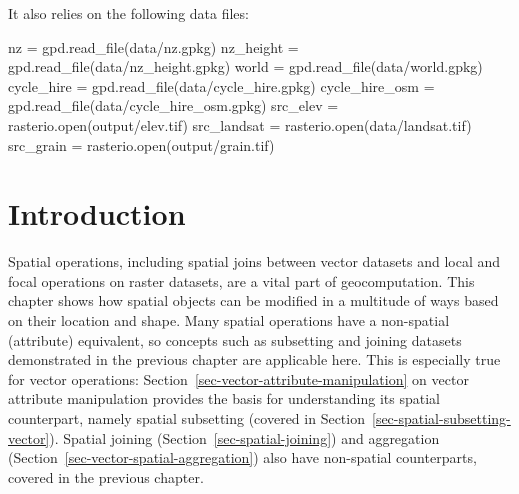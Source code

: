 \documentclass[
  letterpaper,
]{krantz}
\newenvironment{Shaded}{\begin{snugshade}}{\end{snugshade}}
\newcommand{\BuiltInTok}[1]{\textcolor[rgb]{0.00,0.23,0.31}{#1}}
\newcommand{\NormalTok}[1]{\textcolor[rgb]{0.00,0.23,0.31}{#1}}
\newcommand{\OperatorTok}[1]{\textcolor[rgb]{0.37,0.37,0.37}{#1}}
\newcommand{\StringTok}[1]{\textcolor[rgb]{0.13,0.47,0.30}{#1}}
\begin{document}
It also relies on the following data files:

\begin{Shaded}
\begin{Highlighting}[]
\NormalTok{nz }\OperatorTok{=}\NormalTok{ gpd.read\_file(}\StringTok{\textquotesingle{}data/nz.gpkg\textquotesingle{}}\NormalTok{)}
\NormalTok{nz\_height }\OperatorTok{=}\NormalTok{ gpd.read\_file(}\StringTok{\textquotesingle{}data/nz\_height.gpkg\textquotesingle{}}\NormalTok{)}
\NormalTok{world }\OperatorTok{=}\NormalTok{ gpd.read\_file(}\StringTok{\textquotesingle{}data/world.gpkg\textquotesingle{}}\NormalTok{)}
\NormalTok{cycle\_hire }\OperatorTok{=}\NormalTok{ gpd.read\_file(}\StringTok{\textquotesingle{}data/cycle\_hire.gpkg\textquotesingle{}}\NormalTok{)}
\NormalTok{cycle\_hire\_osm }\OperatorTok{=}\NormalTok{ gpd.read\_file(}\StringTok{\textquotesingle{}data/cycle\_hire\_osm.gpkg\textquotesingle{}}\NormalTok{)}
\NormalTok{src\_elev }\OperatorTok{=}\NormalTok{ rasterio.}\BuiltInTok{open}\NormalTok{(}\StringTok{\textquotesingle{}output/elev.tif\textquotesingle{}}\NormalTok{)}
\NormalTok{src\_landsat }\OperatorTok{=}\NormalTok{ rasterio.}\BuiltInTok{open}\NormalTok{(}\StringTok{\textquotesingle{}data/landsat.tif\textquotesingle{}}\NormalTok{)}
\NormalTok{src\_grain }\OperatorTok{=}\NormalTok{ rasterio.}\BuiltInTok{open}\NormalTok{(}\StringTok{\textquotesingle{}output/grain.tif\textquotesingle{}}\NormalTok{)}
\end{Highlighting}
\end{Shaded}

\section{Introduction}\label{introduction-2}

Spatial operations, including spatial joins between vector datasets and
local and focal operations on raster datasets, are a vital part of
geocomputation. This chapter shows how spatial objects can be modified
in a multitude of ways based on their location and shape. Many spatial
operations have a non-spatial (attribute) equivalent, so concepts such
as subsetting and joining datasets demonstrated in the previous chapter
are applicable here. This is especially true for vector operations:
Section~\ref{sec-vector-attribute-manipulation} on vector attribute
manipulation provides the basis for understanding its spatial
counterpart, namely spatial subsetting (covered in
Section~\ref{sec-spatial-subsetting-vector}). Spatial joining
(Section~\ref{sec-spatial-joining}) and aggregation
(Section~\ref{sec-vector-spatial-aggregation}) also have non-spatial
counterparts, covered in the previous chapter.
\end{document}
